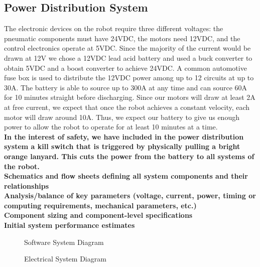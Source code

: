 \documentclass[letterpaper,12pt]{article}
\newcommand{\xxx}[1]{{\color{red}\bf #1}}
\begin{document}
\subsection{Power Distribution System}
The electronic devices on the robot require three different voltages: the
pneumatic components must have 24VDC, the motors need 12VDC, and the control
electronics operate at 5VDC. Since the majority of the current would be drawn
at 12V we chose a 12VDC lead acid battery and used a buck converter to obtain
5VDC and a boost converter to achieve 24VDC. A common automotive fuse box is
used to distribute the 12VDC power among up to 12 circuits at up to 30A. The
battery is able to source up to 300A at any time and can source 60A for 10
minutes straight before discharging. Since our motors will draw at least 2A at
free current, we expect that once the robot achieves a constant velocity, each
motor will draw around 10A. Thus, we expect our battery to give us enough power
to allow the robot to operate for at least 10 minutes at a time.\\

\xxx{In the interest of safety, we have included in the power distribution
system a kill switch that is triggered by physically pulling a bright orange
lanyard.  This cuts the power from the battery to all systems of the robot.}\\


\xxx{Schematics and flow sheets defining all system components and their relationships}\\
\xxx{Analysis/balance of key parameters (voltage, current, power, timing or computing requirements, mechanical parameters, etc.)}\\
\xxx{Component sizing and component-level specifications}\\
\xxx{Initial system performance estimates}
\begin{figure}[h!]
  \centering
  
  \caption{Software System Diagram}
  \label{fig:system_diagram}
\end{figure}

\begin{figure}[h!]
  \centering
  
  \caption{Electrical System Diagram}
  \label{fig:e_system}
\end{figure}
\end{document}
